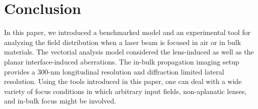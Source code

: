 \documentclass[9pt,twocolumn,twoside]{osajnl}
\begin{document}

\section{Conclusion}
In this paper, we introduced a benchmarked model and an experimental tool for analyzing the field distribution when a laser beam is focused in air or in bulk materials. The vectorial analysis model considered the lens-induced as well as the planar interface-induced aberrations. The in-bulk propagation imaging setup provides a 300-nm longitudinal resolution and diffraction limited lateral resolution. Using the tools introduced in this paper, one can deal with a wide variety of focus conditions in which arbitrary input fields, non-aplanatic lenses, and in-bulk focus might be involved. 
\end{document}
